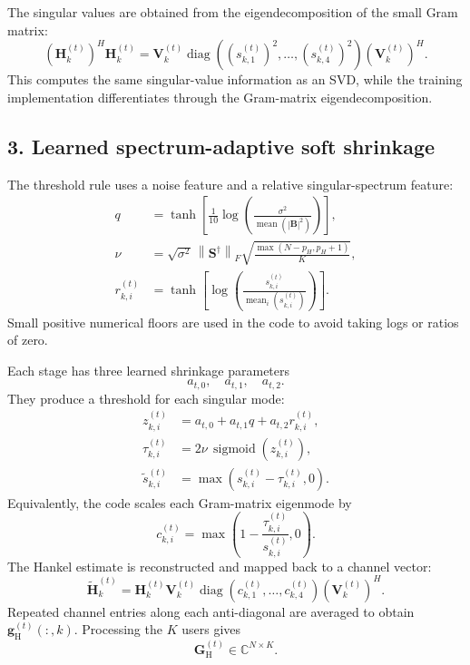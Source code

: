 ﻿\documentclass[11pt,a4paper]{article}
\begin{document}
The singular values are obtained from the eigendecomposition of the
small Gram matrix:
\begin{equation}
\left(\bm{H}_{k}^{(t)}\right)^H\bm{H}_{k}^{(t)}
=
\bm{V}_{k}^{(t)}
\operatorname{diag}\!\left((s_{k,1}^{(t)})^2,\ldots,
(s_{k,4}^{(t)})^2\right)
\left(\bm{V}_{k}^{(t)}\right)^H.
\end{equation}
This computes the same singular-value information as an SVD, while the
training implementation differentiates through the Gram-matrix
eigendecomposition.

\subsection{3. Learned spectrum-adaptive soft shrinkage}

The threshold rule uses a noise feature and a relative singular-spectrum
feature:
\begin{align}
q
&=
\tanh\!\left[
\frac{1}{10}
\log\!\left(
\frac{\sigma^2}
{\operatorname{mean}(|\bm{B}|^2)}
\right)
\right],\\
\nu
&=
\sqrt{\sigma^2}\,
\left\|\bm{S}^{\dagger}\right\|_F
\sqrt{\frac{\max(N-p_H,p_H+1)}{K}},\\
r_{k,i}^{(t)}
&=
\tanh\!\left[
\log\!\left(
\frac{s_{k,i}^{(t)}}
{\operatorname{mean}_{i}(s_{k,i}^{(t)})}
\right)
\right].
\end{align}
Small positive numerical floors are used in the code to avoid taking
logs or ratios of zero.

Each stage has three learned shrinkage parameters
\[
a_{t,0},\quad a_{t,1},\quad a_{t,2}.
\]
They produce a threshold for each singular mode:
\begin{align}
z_{k,i}^{(t)}
&=
a_{t,0}+a_{t,1}q+a_{t,2}r_{k,i}^{(t)},\\
\tau_{k,i}^{(t)}
&=
2\nu\,\operatorname{sigmoid}\!\left(z_{k,i}^{(t)}\right),\\
\widetilde{s}_{k,i}^{(t)}
&=
\max\!\left(s_{k,i}^{(t)}-\tau_{k,i}^{(t)},0\right).
\end{align}
Equivalently, the code scales each Gram-matrix eigenmode by
\[
c_{k,i}^{(t)}
=
\max\!\left(
1-\frac{\tau_{k,i}^{(t)}}{s_{k,i}^{(t)}},0
\right).
\]
The Hankel estimate is reconstructed and mapped back to a channel vector:
\begin{equation}
\widetilde{\bm{H}}_{k}^{(t)}
=
\bm{H}_{k}^{(t)}
\bm{V}_{k}^{(t)}
\operatorname{diag}\!\left(c_{k,1}^{(t)},\ldots,c_{k,4}^{(t)}\right)
\left(\bm{V}_{k}^{(t)}\right)^H.
\end{equation}
Repeated channel entries along each anti-diagonal are averaged to obtain
\(\bm{g}_{\mathrm{H}}^{(t)}(:,k)\). Processing the \(K\) users gives
\[
\bm{G}_{\mathrm{H}}^{(t)}\in\mathbb{C}^{N\times K}.
\]
\end{document}
